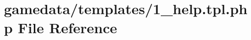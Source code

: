 \hypertarget{1__help_8tpl_8php}{\section{gamedata/templates/1\+\_\+help.tpl.\+php File Reference}
\label{1__help_8tpl_8php}
}
